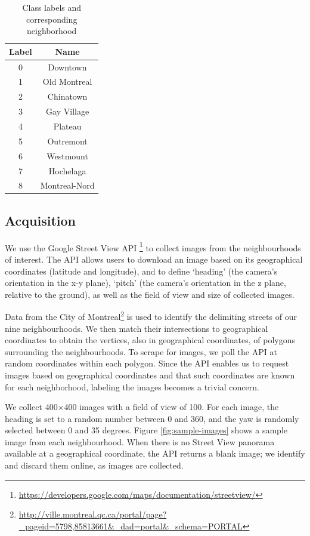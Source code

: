 \documentclass{acm_proc_article-sp}
\begin{document}
\begin{table}[h!]
\caption{Class labels and corresponding neighborhood}
\label{tbl:boroughlist}
\centering
\begin{tabular}{| c | c |}
\hline
\textbf{Label} & \textbf{Name} \\ \hline 
0 & Downtown \\
1 & Old Montreal \\
2 & Chinatown \\
3 & Gay Village \\
4 & Plateau \\
5 & Outremont \\
6 & Westmount \\
7 & Hochelaga \\
8 & Montreal-Nord \\ \hline
\end{tabular}
\end{table}

\subsection{Acquisition}
We use the Google Street View API \footnote{\url{https://developers.google.com/maps/documentation/streetview/}} to collect images from the neighbourhoods of interest. The API allows users to download an image based on its geographical coordinates (latitude and longitude), and to define `heading' (the camera's orientation in the x-y plane), `pitch' (the camera's orientation in the z plane, relative to the ground), as well as the field of view and size of collected images. 

Data from the City of Montreal\footnote{\url{http://ville.montreal.qc.ca/portal/page?_pageid=5798,85813661&_dad=portal&_schema=PORTAL}} is used to identify the delimiting streets of our nine neighbourhoods. We then match their intersections to geographical coordinates to obtain the vertices, also in geographical coordinates, of polygons surrounding the neighbourhoods. To scrape for images, we poll the API at random coordinates within each polygon. Since the API enables us to request images based on geographical coordinates and that such coordinates are known for each neighborhood, labeling the images becomes a trivial concern.

We collect 400$\times$400 images with a field of view of 100. For each image, the heading is set to a random number between 0 and 360, and the yaw is randomly selected between 0 and 35 degrees. Figure \ref{fig:sample-images} shows a sample image from each neighbourhood. When there is no Street View panorama available at a geographical coordinate, the API returns a blank image; we identify and discard them online, as images are collected.
\end{document}
